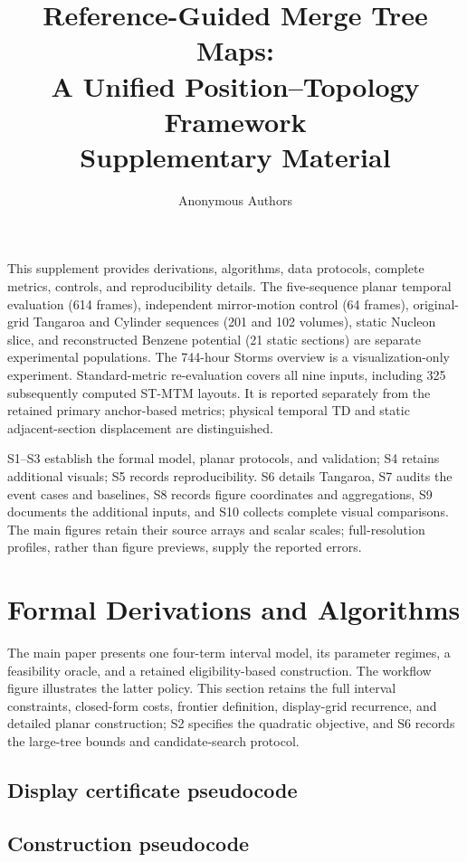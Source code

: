 \documentclass[10pt,letterpaper]{article}
\title{Reference-Guided Merge Tree Maps:\\A Unified Position--Topology Framework\\Supplementary Material}
\author{Anonymous Authors}\date{}
\theoremstyle{remark}\newtheorem{remark}[lemma]{Remark}
\begin{document}
\maketitle
This supplement provides derivations, algorithms, data protocols, complete metrics, controls, and reproducibility details. The five-sequence planar temporal evaluation (614 frames), independent mirror-motion control (64 frames), original-grid Tangaroa and Cylinder sequences (201 and 102 volumes), static Nucleon slice, and reconstructed Benzene potential (21 static sections) are separate experimental populations. The 744-hour Storms overview is a visualization-only experiment. Standard-metric re-evaluation covers all nine inputs, including 325 subsequently computed ST-MTM layouts. It is reported separately from the retained primary anchor-based metrics; physical temporal TD and static adjacent-section displacement are distinguished.

S1--S3 establish the formal model, planar protocols, and validation; S4 retains additional visuals; S5 records reproducibility. S6 details Tangaroa, S7 audits the event cases and baselines, S8 records figure coordinates and aggregations, S9 documents the additional inputs, and S10 collects complete visual comparisons. The main figures retain their source arrays and scalar scales; full-resolution profiles, rather than figure previews, supply the reported errors.
\begingroup\small\tableofcontents\endgroup\clearpage
\section{Formal Derivations and Algorithms}
The main paper presents one four-term interval model, its parameter regimes, a feasibility oracle, and a retained eligibility-based construction. The workflow figure illustrates the latter policy. This section retains the full interval constraints, closed-form costs, frontier definition, display-grid recurrence, and detailed planar construction; S2 specifies the quadratic objective, and S6 records the large-tree bounds and candidate-search protocol.


\subsection{Display certificate pseudocode}

\subsection{Construction pseudocode}

\end{document}
